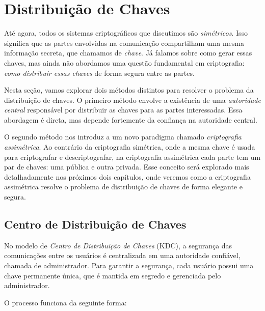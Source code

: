 \chapter{Distribuição de Chaves}
\label{cha:distribuicao-chaves}

Até agora, todos os sistemas criptográficos que discutimos são {\em simétricos}.
Isso significa que as partes envolvidas na comunicação compartilham uma mesma informação secreta, que chamamos de {\em chave}.
Já falamos sobre como gerar essas chaves, mas ainda não abordamos uma questão fundamental em criptografia:
{\em como distribuir essas chaves} de forma segura entre as partes.

Nesta seção, vamos explorar dois métodos distintos para resolver o problema da distribuição de chaves.
O primeiro método envolve a existência de uma {\em autoridade central} responsável por distribuir as chaves para as partes interessadas.
Essa abordagem é direta, mas depende fortemente da confiança na autoridade central.

O segundo método nos introduz a um novo paradigma chamado {\em criptografia assimétrica}.
Ao contrário da criptografia simétrica, onde a mesma chave é usada para criptografar e descriptografar, na criptografia assimétrica cada parte tem um par de chaves:
uma pública e outra privada.
Esse conceito será explorado mais detalhadamente nos próximos dois capítulos, onde veremos como a criptografia assimétrica resolve o problema de distribuição de chaves de forma elegante e segura.

\section{Centro de Distribuição de Chaves}
\label{sec:kdc}

No modelo de {\em Centro de Distribuição de Chaves} (KDC), a segurança das comunicações entre os usuários é centralizada em uma autoridade confiável, chamada de administrador.
Para garantir a segurança, cada usuário possui uma chave permanente única, que é mantida em segredo e gerenciada pelo administrador.

O processo funciona da seguinte forma:

